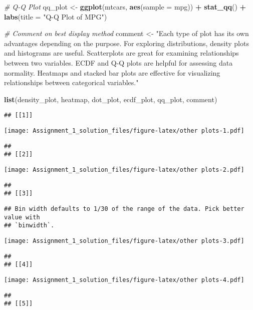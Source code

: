 \documentclass[
]{article}
\newenvironment{Shaded}{\begin{snugshade}}{\end{snugshade}}
\newcommand{\AttributeTok}[1]{\textcolor[rgb]{0.13,0.29,0.53}{#1}}
\newcommand{\CommentTok}[1]{\textcolor[rgb]{0.56,0.35,0.01}{\textit{#1}}}
\newcommand{\FunctionTok}[1]{\textcolor[rgb]{0.13,0.29,0.53}{\textbf{#1}}}
\newcommand{\NormalTok}[1]{#1}
\newcommand{\OtherTok}[1]{\textcolor[rgb]{0.56,0.35,0.01}{#1}}
\newcommand{\SpecialCharTok}[1]{\textcolor[rgb]{0.81,0.36,0.00}{\textbf{#1}}}
\newcommand{\StringTok}[1]{\textcolor[rgb]{0.31,0.60,0.02}{#1}}
\begin{document}
\begin{Shaded}
\begin{Highlighting}[]
\CommentTok{\# Q{-}Q Plot}
\NormalTok{qq\_plot }\OtherTok{\textless{}{-}} \FunctionTok{ggplot}\NormalTok{(mtcars, }\FunctionTok{aes}\NormalTok{(}\AttributeTok{sample =}\NormalTok{ mpg)) }\SpecialCharTok{+}
           \FunctionTok{stat\_qq}\NormalTok{() }\SpecialCharTok{+}
           \FunctionTok{labs}\NormalTok{(}\AttributeTok{title =} \StringTok{"Q{-}Q Plot of MPG"}\NormalTok{)}

\CommentTok{\# Comment on best display method}
\NormalTok{comment }\OtherTok{\textless{}{-}} \StringTok{"Each type of plot has its own advantages depending on the purpose. For exploring distributions, density plots and histograms are useful. Scatterplots are great for examining relationships between two variables. ECDF and Q{-}Q plots are helpful for assessing data normality. Heatmaps and stacked bar plots are effective for visualizing relationships between categorical variables."}

\FunctionTok{list}\NormalTok{(density\_plot, heatmap, dot\_plot, ecdf\_plot, qq\_plot, comment)}
\end{Highlighting}
\end{Shaded}

\begin{verbatim}
## [[1]]
\end{verbatim}

\texttt{[image: Assignment\_1\_solution\_files/figure-latex/other plots-1.pdf]}

\begin{verbatim}
## 
## [[2]]
\end{verbatim}

\texttt{[image: Assignment\_1\_solution\_files/figure-latex/other plots-2.pdf]}

\begin{verbatim}
## 
## [[3]]
\end{verbatim}

\begin{verbatim}
## Bin width defaults to 1/30 of the range of the data. Pick better value with
## `binwidth`.
\end{verbatim}

\texttt{[image: Assignment\_1\_solution\_files/figure-latex/other plots-3.pdf]}

\begin{verbatim}
## 
## [[4]]
\end{verbatim}

\texttt{[image: Assignment\_1\_solution\_files/figure-latex/other plots-4.pdf]}

\begin{verbatim}
## 
## [[5]]
\end{verbatim}
\end{document}
